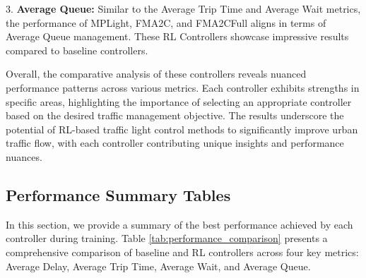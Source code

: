 3. \textbf{Average Queue:} Similar to the Average Trip Time and Average Wait metrics, the performance of MPLight, FMA2C, and FMA2CFull aligns in terms of Average Queue management. These RL Controllers showcase impressive results compared to baseline controllers.

Overall, the comparative analysis of these controllers reveals nuanced performance patterns across various metrics. Each controller exhibits strengths in specific areas, highlighting the importance of selecting an appropriate controller based on the desired traffic management objective. The results underscore the potential of RL-based traffic light control methods to significantly improve urban traffic flow, with each controller contributing unique insights and performance nuances.

\subsection{Performance Summary Tables}

In this section, we provide a summary of the best performance achieved by each controller during training. Table \ref{tab:performance_comparison} presents a comprehensive comparison of baseline and RL controllers across four key metrics: Average Delay, Average Trip Time, Average Wait, and Average Queue.


